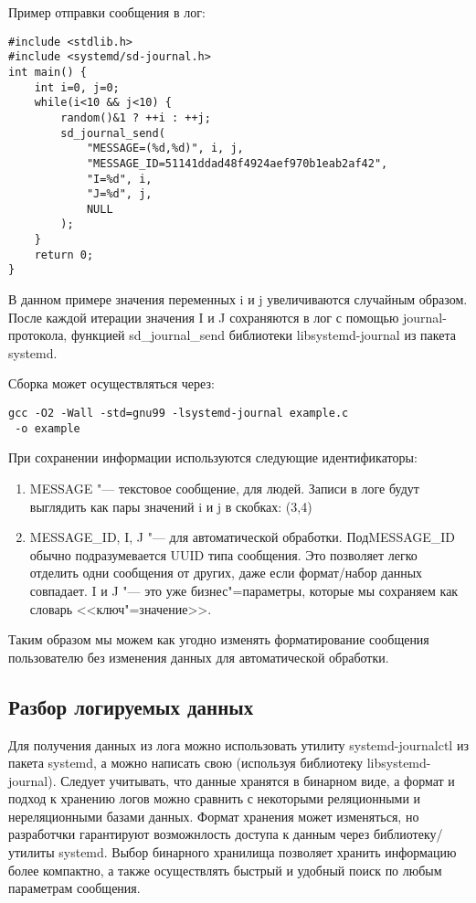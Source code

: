 \documentclass[10pt, a5paper]{article}
\begin{document}
Пример отправки сообщения в лог:

\begin{verbatim}
#include <stdlib.h>
#include <systemd/sd-journal.h>
int main() {
    int i=0, j=0;
    while(i<10 && j<10) {
        random()&1 ? ++i : ++j;
        sd_journal_send(
            "MESSAGE=(%d,%d)", i, j,
            "MESSAGE_ID=51141ddad48f4924aef970b1eab2af42",
            "I=%d", i, 
            "J=%d", j,
            NULL
        );
    }
    return 0;
}
\end{verbatim}

В данном примере значения переменных i и j увеличиваются случайным образом. После каждой итерации значения I и J сохраняются в лог с помощью journal-протокола, функцией sd\_journal\_send библиотеки libsystemd-journal из пакета systemd.

Сборка может осуществляться через:

\begin{verbatim}
gcc -O2 -Wall -std=gnu99 -lsystemd-journal example.c
 -o example
\end{verbatim}

При сохранении информации используются следующие идентификаторы:

\begin{enumerate}
  \item MESSAGE "--- текстовое сообщение, для людей. Записи в логе будут выглядить как пары значений i и j в скобках: (3,4)
  \item MESSAGE\_ID, I, J "--- для автоматической обработки. Под\linebreak MESSAGE\_ID обычно подразумевается UUID типа сообщения. Это позволяет легко отделить одни сообщения от других, даже если формат/набор данных совпадает. I и J "--- это уже бизнес"=параметры, которые мы сохраняем как словарь <<ключ"=значение>>.
\end{enumerate}

Таким образом мы можем как угодно изменять форматирование сообщения пользователю без изменения данных для автоматической обработки.

\subsection*{Разбор логируемых данных}

Для получения данных из лога можно использовать утилиту systemd-journalctl из пакета systemd, а можно написать свою (используя библиотеку libsystemd-journal). Следует учитывать, что данные хранятся в бинарном виде, а формат и подход к хранению логов можно сравнить с некоторыми реляционными и нереляционными базами данных. Формат хранения может изменяться, но разработчки гарантируют возможнлость доступа к данным через библиотеку/утилиты systemd. Выбор бинарного хранилища позволяет хранить информацию более компактно, а также осуществлять быстрый и удобный поиск по любым параметрам сообщения.
\end{document}
